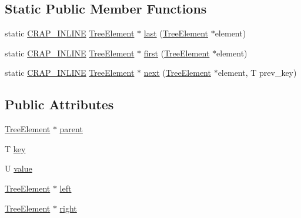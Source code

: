 \subsection*{Static Public Member Functions}
\begin{DoxyCompactItemize}
\item 
static \hyperlink{compilers_8h_a5a40526b8d842e7ff731509998bb0f1c}{C\-R\-A\-P\-\_\-\-I\-N\-L\-I\-N\-E} \hyperlink{structcrap_1_1container_1_1_tree_element}{Tree\-Element} $\ast$ \hyperlink{structcrap_1_1container_1_1_tree_element_a69a2d30a7818e39417afb8b6f39276ae}{last} (\hyperlink{structcrap_1_1container_1_1_tree_element}{Tree\-Element} $\ast$element)
\item 
static \hyperlink{compilers_8h_a5a40526b8d842e7ff731509998bb0f1c}{C\-R\-A\-P\-\_\-\-I\-N\-L\-I\-N\-E} \hyperlink{structcrap_1_1container_1_1_tree_element}{Tree\-Element} $\ast$ \hyperlink{structcrap_1_1container_1_1_tree_element_a87bff15b09fb7fe099b0608ce0ef54bd}{first} (\hyperlink{structcrap_1_1container_1_1_tree_element}{Tree\-Element} $\ast$element)
\item 
static \hyperlink{compilers_8h_a5a40526b8d842e7ff731509998bb0f1c}{C\-R\-A\-P\-\_\-\-I\-N\-L\-I\-N\-E} \hyperlink{structcrap_1_1container_1_1_tree_element}{Tree\-Element} $\ast$ \hyperlink{structcrap_1_1container_1_1_tree_element_a789714db0b3b27910b95641bc2edb709}{next} (\hyperlink{structcrap_1_1container_1_1_tree_element}{Tree\-Element} $\ast$element, T prev\-\_\-key)
\end{DoxyCompactItemize}
\subsection*{Public Attributes}
\begin{DoxyCompactItemize}
\item 
\hyperlink{structcrap_1_1container_1_1_tree_element}{Tree\-Element} $\ast$ \hyperlink{structcrap_1_1container_1_1_tree_element_a6b9d769dc6d4f4c38e05611e97903828}{parent}
\item 
T \hyperlink{structcrap_1_1container_1_1_tree_element_aa88bafeb32ce41efef4db753efa6a542}{key}
\item 
U \hyperlink{structcrap_1_1container_1_1_tree_element_ab85c021334d56f436f982126190e89af}{value}
\item 
\hyperlink{structcrap_1_1container_1_1_tree_element}{Tree\-Element} $\ast$ \hyperlink{structcrap_1_1container_1_1_tree_element_a2bfdfb584212fb946eeaeda183a55359}{left}
\item 
\hyperlink{structcrap_1_1container_1_1_tree_element}{Tree\-Element} $\ast$ \hyperlink{structcrap_1_1container_1_1_tree_element_a324ebeea6528e5f4a687bcba5e5e60f8}{right}
\end{DoxyCompactItemize}


